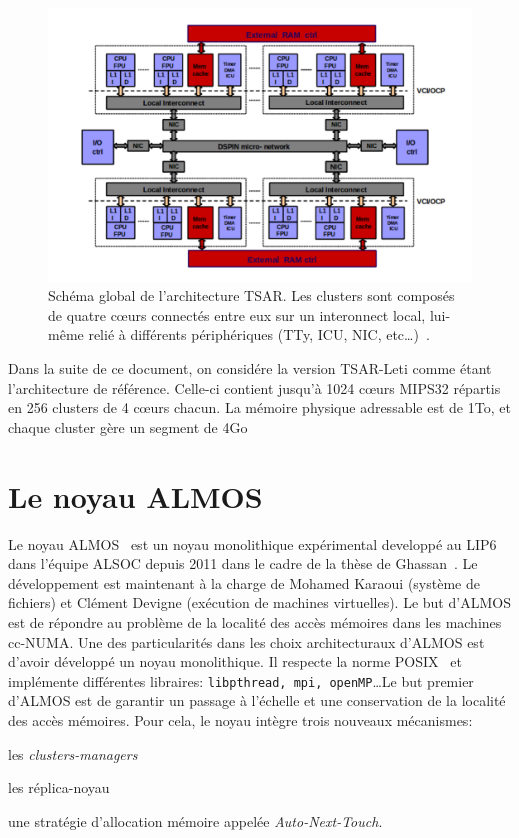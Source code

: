     \begin{figure}[ht]
      \centering \includegraphics[scale=0.241]{include/img/tsar.png}
      \caption{Schéma global de l'architecture TSAR. Les clusters sont composés
        de quatre c\oe urs connectés entre eux sur un interonnect local,
        lui-même relié à différents périphériques (TTy, ICU, NIC,
        etc\ldots)~\citep{greiner2009tsar}.}
      \label{fig:tsar}
    \end{figure}
     

    Dans la suite de ce document, on considére la version TSAR-Leti comme étant
    l'architecture de référence. Celle-ci contient jusqu'à 1024 c\oe urs MIPS32
    répartis en 256 clusters de 4 c\oe urs chacun. La mémoire physique
    adressable est de 1To, et chaque cluster gère un segment de 4Go


  \section{Le noyau ALMOS}
  \label{sec:almos}

    Le noyau ALMOS~\cite{almaless2011almos,almaless2014universite} est un noyau
    monolithique expérimental developpé au LIP6 dans l'équipe ALSOC depuis 2011
    dans le cadre de la thèse de Ghassan~\citeauthor{almaless2014universite}. Le
    développement est maintenant à la charge de Mohamed Karaoui (système de
    fichiers) et Clément Devigne (exécution de machines virtuelles). Le but
    d'ALMOS est de répondre au problème de la localité des accès mémoires dans
    les machines cc-NUMA. Une des particularités dans les choix architecturaux
    d'ALMOS est d'avoir développé un noyau monolithique. Il respecte la norme
    POSIX~\cite{posix2013} et implémente différentes libraires:
    \texttt{libpthread, mpi, openMP}\ldots Le but premier d'ALMOS est de
    garantir un passage à l'échelle et une conservation de la localité des accès
    mémoires. Pour cela, le noyau intègre trois nouveaux mécanismes:
    \benumline \item les \textit{clusters-managers} \item les
    réplica-noyau \item une stratégie d'allocation mémoire appelée
    \textit{Auto-Next-Touch}\eenumline.

